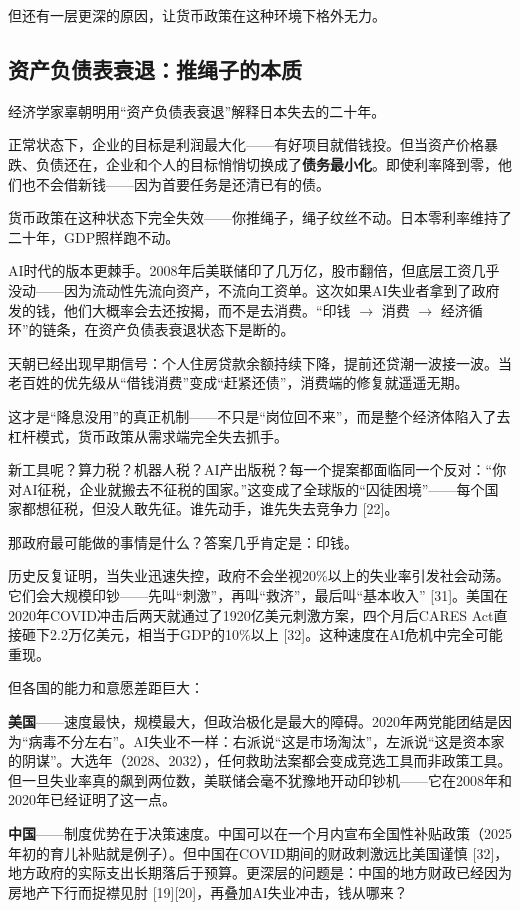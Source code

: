 \documentclass[11pt,a4paper]{ctexart}
\begin{document}
但还有一层更深的原因，让货币政策在这种环境下格外无力。

\subsection{资产负债表衰退：推绳子的本质}

经济学家辜朝明用“资产负债表衰退”解释日本失去的二十年。

正常状态下，企业的目标是利润最大化——有好项目就借钱投。但当资产价格暴跌、负债还在，企业和个人的目标悄悄切换成了\textbf{债务最小化}。即使利率降到零，他们也不会借新钱——因为首要任务是还清已有的债。

货币政策在这种状态下完全失效——你推绳子，绳子纹丝不动。日本零利率维持了二十年，GDP照样跑不动。

AI时代的版本更棘手。2008年后美联储印了几万亿，股市翻倍，但底层工资几乎没动——因为流动性先流向资产，不流向工资单。这次如果AI失业者拿到了政府发的钱，他们大概率会去还按揭，而不是去消费。“印钱 $\to$ 消费 $\to$ 经济循环”的链条，在资产负债表衰退状态下是断的。

天朝已经出现早期信号：个人住房贷款余额持续下降，提前还贷潮一波接一波。当老百姓的优先级从“借钱消费”变成“赶紧还债”，消费端的修复就遥遥无期。

这才是“降息没用”的真正机制——不只是“岗位回不来”，而是整个经济体陷入了去杠杆模式，货币政策从需求端完全失去抓手。

新工具呢？算力税？机器人税？AI产出版税？每一个提案都面临同一个反对：“你对AI征税，企业就搬去不征税的国家。”这变成了全球版的“囚徒困境”——每个国家都想征税，但没人敢先征。谁先动手，谁先失去竞争力 [22]。

那政府最可能做的事情是什么？答案几乎肯定是：印钱。

历史反复证明，当失业迅速失控，政府不会坐视20\%以上的失业率引发社会动荡。它们会大规模印钞——先叫“刺激”，再叫“救济”，最后叫“基本收入” [31]。美国在2020年COVID冲击后两天就通过了1920亿美元刺激方案，四个月后CARES Act直接砸下2.2万亿美元，相当于GDP的10\%以上 [32]。这种速度在AI危机中完全可能重现。

但各国的能力和意愿差距巨大：

\textbf{美国}——速度最快，规模最大，但政治极化是最大的障碍。2020年两党能团结是因为“病毒不分左右”。AI失业不一样：右派说“这是市场淘汰”，左派说“这是资本家的阴谋”。大选年（2028、2032），任何救助法案都会变成竞选工具而非政策工具。但一旦失业率真的飙到两位数，美联储会毫不犹豫地开动印钞机——它在2008年和2020年已经证明了这一点。

\textbf{中国}——制度优势在于决策速度。中国可以在一个月内宣布全国性补贴政策（2025年初的育儿补贴就是例子）。但中国在COVID期间的财政刺激远比美国谨慎 [32]，地方政府的实际支出长期落后于预算。更深层的问题是：中国的地方财政已经因为房地产下行而捉襟见肘 [19][20]，再叠加AI失业冲击，钱从哪来？
\end{document}
